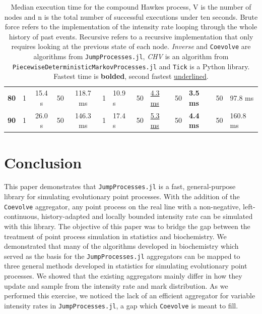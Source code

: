 \documentclass{juliacon}
\begin{document}
\begin{table}
\begin{tabular}{lccccllllllll}
\textbf{80} & 1  & 15.4 s            & 50 & 118.7 ms          & 1  & 10.9 s            & 50 & \underline{4.3 ms}              & 50 & \textbf{3.5 ms}               & 50            & 97.8 ms           \\
\textbf{90} & 1  & 26.0 s            & 50 & 146.3 ms          & 1  & 17.4 s            & 50 & \underline{5.3 ms}              & 50 & \textbf{4.4 ms}               & 50            & 160.8 ms          \\
\bottomrule
\end{tabular}
\caption{Median execution time for the compound Hawkes process, V is the number of nodes and n is the total number of successful executions under ten seconds. Brute force refers to the implementation of the intensity rate looping through the whole history of past events. Recursive refers to a recursive implementation that only requires looking at the previous state of each node. \textit{Inverse} and \texttt{Coevolve} are algorithms from \texttt{JumpProcesses.jl}, \textit{CHV} is an algorithm from \texttt{PiecewiseDeterministicMarkovProcesses.jl} and \texttt{Tick} is a Python library. Fastest time is \textbf{bolded}, second fastest \underline{underlined}.}
\label{tab:benchmark-hawkes}
\end{table}

\section{Conclusion}

This paper demonstrates that \texttt{JumpProcesses.jl} is a fast, general-purpose library for simulating evolutionary point processes. With the addition of the \texttt{Coevolve} aggregator, any point process on the real line with a non-negative, left-continuous, history-adapted and locally bounded intensity rate can be simulated with this library. The objective of this paper was to bridge the gap between the treatment of point process simulation in statistics and biochemistry. We demonstrated that many of the algorithms developed in biochemistry which served as the basis for the \texttt{JumpProcesses.jl} aggregators can be mapped to three general methods developed in statistics for simulating evolutionary point processes. We showed that the existing aggregators mainly differ in how they update and sample from the intensity rate and mark distribution. As we performed this exercise, we noticed the lack of an efficient aggregator for variable intensity rates in \texttt{JumpProcesses.jl}, a gap which \texttt{Coevolve} is meant to fill.
\end{document}
